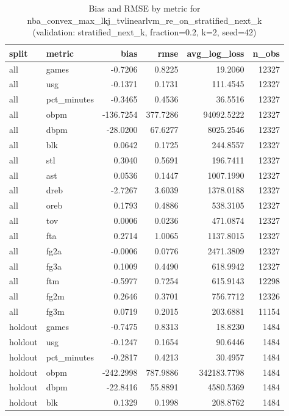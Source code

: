 \begin{table}
\caption{Bias and RMSE by metric for nba_convex_max_lkj_tvlinearlvm_re_on_stratified_next_k (validation: stratified_next_k, fraction=0.2, k=2, seed=42)}
\label{tab:nba_convex_max_lkj_tvlinearlvm_re_on_stratified_next_k_vs_stratified_next_k_f20_k2_s42_bias_rmse}
\begin{tabular}{llrrrr}
\toprule
split & metric & bias & rmse & avg\_log\_loss & n\_obs \\
\midrule
all & games & -0.7206 & 0.8225 & 19.2060 & 12327 \\
all & usg & -0.1371 & 0.1731 & 111.4545 & 12327 \\
all & pct\_minutes & -0.3465 & 0.4536 & 36.5516 & 12327 \\
all & obpm & -136.7254 & 377.7286 & 94092.5222 & 12327 \\
all & dbpm & -28.0200 & 67.6277 & 8025.2546 & 12327 \\
all & blk & 0.0642 & 0.1725 & 244.8557 & 12327 \\
all & stl & 0.3040 & 0.5691 & 196.7411 & 12327 \\
all & ast & 0.0536 & 0.1447 & 1007.1990 & 12327 \\
all & dreb & -2.7267 & 3.6039 & 1378.0188 & 12327 \\
all & oreb & 0.1793 & 0.4886 & 538.3105 & 12327 \\
all & tov & 0.0006 & 0.0236 & 471.0874 & 12327 \\
all & fta & 0.2714 & 1.0065 & 1137.8015 & 12327 \\
all & fg2a & -0.0006 & 0.0776 & 2471.3809 & 12327 \\
all & fg3a & 0.1009 & 0.4490 & 618.9942 & 12327 \\
all & ftm & -0.5977 & 0.7254 & 615.9143 & 12298 \\
all & fg2m & 0.2646 & 0.3701 & 756.7712 & 12326 \\
all & fg3m & 0.0719 & 0.2015 & 203.6881 & 11154 \\
holdout & games & -0.7475 & 0.8313 & 18.8230 & 1484 \\
holdout & usg & -0.1247 & 0.1654 & 90.6446 & 1484 \\
holdout & pct\_minutes & -0.2817 & 0.4213 & 30.4957 & 1484 \\
holdout & obpm & -242.2998 & 787.9886 & 342183.7798 & 1484 \\
holdout & dbpm & -22.8416 & 55.8891 & 4580.5369 & 1484 \\
holdout & blk & 0.1329 & 0.1998 & 208.8762 & 1484 \\

\end{tabular}
\end{table}
